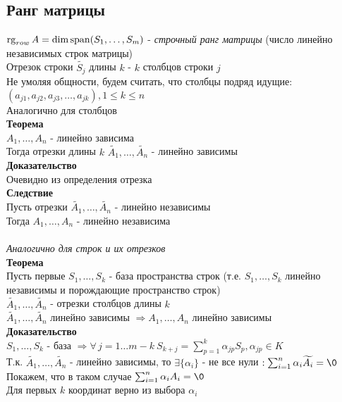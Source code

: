 \documentclass[12pt]{article}
\begin{document}
\subsection{Ранг матрицы}
$\operatorname{rg}_{row} A = \dim \operatorname{span} (S_1,\ldots,S_m)$ - \textit{строчный ранг матрицы} (число линейно независимых строк матрицы)\\
Отрезок строки $\widetilde{S_j}$ длины $k$ - $k$ столбцов строки $j$\\
Не умоляя общности, будем считать, что столбцы подряд идущие: $(a_{j1}, a_{j2}, a_{j3},\ldots,a_{jk}), 1\leq k \leq n$\\
Аналогично для столбцов\\
\textbf{Теорема}\\
$A_1,\ldots,A_n$ - линейно зависима\\
Тогда отрезки длины $k$ $\widetilde{A_1}, \ldots, \widetilde{A_n}$ - линейно зависимы\\
\textbf{Доказательство}\\
Очевидно из определения отрезка\\
\textbf{Следствие}\\
Пусть отрезки $\widetilde{A_1}, \ldots, \widetilde{A_n}$ - линейно независимы\\
Тогда $A_1,\ldots,A_n$ - линейно независима\\\\
\textit{Аналогично для строк и их отрезков}\\
\textbf{Теорема}\\
Пусть первые $S_1, \ldots, S_k$ - база пространства строк (т.е. $S_1,\ldots, S_k$ линейно независимы и порождающие пространство строк)\\
$\widetilde{A_1}, \ldots, \widetilde{A_n}$ - отрезки столбцов длины $k$\\
$\widetilde{A_1}, \ldots, \widetilde{A_n}$ линейно зависимы $\Rightarrow A_1, \ldots, A_n$ линейно зависимы\\
\textbf{Доказательство}\\
$S_1, \ldots, S_k$ - база $\Rightarrow \forall\,j=1\ldots m-k\ S_{k+j} = \sum_{p=1}^k \alpha_{jp}S_p, \alpha_{jp} \in K$\\
Т.к. $\widetilde{A_1}, \ldots, \widetilde{A_n}$ - линейно зависимы, то $\exists \{\alpha_i\}$ - не все нули $: \sum_{i=1}^n \alpha_i\widetilde{A_i} = \0$\\
Покажем, что в таком случае $\sum_{i=1}^n \alpha_i A_i = \0$\\
Для первых $k$ координат верно из выбора $\alpha_i$\\
\end{document}
